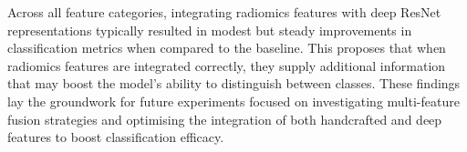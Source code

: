 Across all feature categories, integrating radiomics features with deep ResNet representations typically resulted in modest but steady improvements in classification metrics when compared to the baseline. This proposes that when radiomics features are integrated correctly, they supply additional information that may boost the model's ability to distinguish between classes.
These findings lay the groundwork for future experiments focused on investigating multi-feature fusion strategies and optimising the integration of both handcrafted and deep features to boost classification efficacy.

